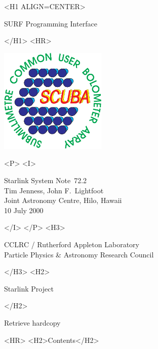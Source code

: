 \documentclass[twoside,11pt]{article}
\newcommand{\stardoccategory}  {Starlink System Note}
\newcommand{\stardocsource}    {ssn\stardocnumber}
\newcommand{\stardocnumber}    {72.2}
\newcommand{\stardocauthors}   {Tim Jenness, John F.\ Lightfoot\\
                                Joint Astronomy Centre, Hilo, Hawaii}
\newcommand{\stardocdate}      {10 July 2000}
\newcommand{\stardoctitle}     {SURF Programming Interface}
\newcommand{\htmladdnormallink}[2]{#1}
\newcommand{\htmladdimg}[1]{}
\newcommand{\htmlref}[2]{#1}
\newcommand{\htmladdtonavigation}[1]{}
\newcommand{\xlabel}[1]{}
\renewcommand{\_}{\texttt{\symbol{95}}}
\begin{document}
\begin{htmlonly}
   \xlabel{}
   \begin{rawhtml} <H1 ALIGN=CENTER> \end{rawhtml}
      \stardoctitle
   \begin{rawhtml} </H1> <HR> \end{rawhtml}

\includegraphics[width=2.0in]{ssn72_logo.eps}

   \begin{rawhtml} <P> <I> \end{rawhtml}
   \stardoccategory\ \stardocnumber \\
   \stardocauthors \\
   \stardocdate
   \begin{rawhtml} </I> </P> <H3> \end{rawhtml}
      \htmladdnormallink{CCLRC}{http://www.cclrc.ac.uk} /
      \htmladdnormallink{Rutherford Appleton Laboratory}
                        {http://www.cclrc.ac.uk/ral} \\
      \htmladdnormallink{Particle Physics \& Astronomy Research Council}
                        {http://www.pparc.ac.uk} \\
   \begin{rawhtml} </H3> <H2> \end{rawhtml}
      \htmladdnormallink{Starlink Project}{http://www.starlink.ac.uk/}
   \begin{rawhtml} </H2> \end{rawhtml}
   \htmladdnormallink{\htmladdimg{source.gif} Retrieve hardcopy}
      {http://www.starlink.ac.uk/cgi-bin/hcserver?\stardocsource}\\

  \label{stardoccontents}
  \begin{rawhtml}
    <HR>
    <H2>Contents</H2>
  \end{rawhtml}
  \htmladdtonavigation{\htmlref{\htmladdimg{contents_motif.gif}}
        {stardoccontents}}


\end{htmlonly}
\end{document}
